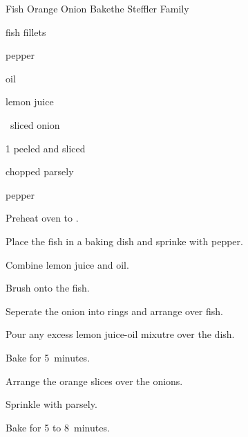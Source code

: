 \begin{recipe}{Fish Orange Onion Bake}{the Steffler Family}{}

\begin{ingredients}
\item \lbs{\half} fish fillets
\item \tp{\quarter} pepper
\item {} oil
\item {} lemon juice
\item \half{}~sliced onion
\item 1 peeled and sliced 
\item {} chopped parsely
\item pepper
\end{ingredients}

\begin{directions}
\item Preheat oven to .
\item Place the fish in a baking dish and sprinke with pepper.
\item Combine lemon juice and oil.
\item Brush onto the fish.
\item Seperate the onion into rings and arrange over fish.
\item Pour any excess lemon juice-oil mixutre over the dish.
\item Bake for 5~minutes.
\item Arrange the orange slices over the onions.
\item Sprinkle with parsely.
\item Bake for 5 to 8~minutes.
\end{directions}
\end{recipe}
